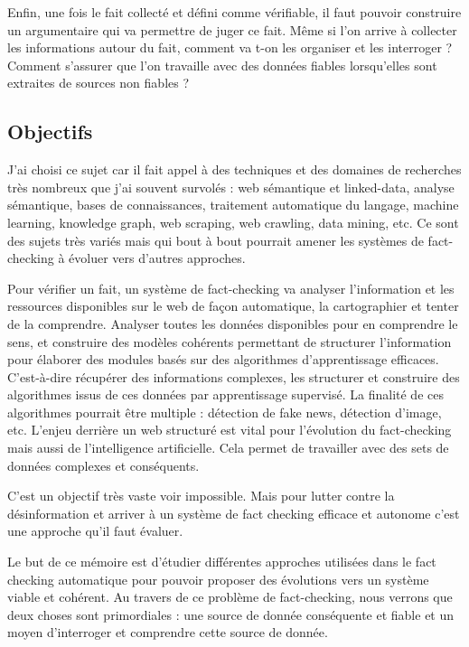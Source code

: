 Enfin, une fois le fait collecté et défini comme vérifiable, il faut pouvoir construire un argumentaire qui va permettre de juger ce fait. Même si l'on arrive à collecter les informations autour du fait, comment va t-on les organiser et les interroger ? Comment s'assurer que l'on travaille avec des données fiables lorsqu'elles sont extraites de sources non fiables ? 

\subsection{Objectifs}

J'ai choisi ce sujet car il fait appel à des techniques et des domaines de recherches très nombreux que j'ai souvent survolés : web sémantique et linked-data, analyse sémantique, bases de connaissances, traitement automatique du langage, machine learning, knowledge graph, web scraping, web crawling, data mining, etc. Ce sont des sujets très variés mais qui bout à bout pourrait amener les systèmes de fact-checking à évoluer vers d'autres approches. 

Pour vérifier un fait, un système de fact-checking va analyser l'information et les ressources disponibles sur le web de façon automatique, la cartographier et tenter de la comprendre. Analyser toutes les données disponibles pour en comprendre le sens, et construire des modèles cohérents permettant de structurer l'information pour élaborer des modules basés sur des algorithmes d'apprentissage efficaces. C'est-à-dire récupérer des informations complexes, les structurer et construire des algorithmes issus de ces données par apprentissage supervisé. La finalité de ces algorithmes pourrait être multiple : détection de fake news, détection d'image, etc. L'enjeu derrière un web structuré est vital pour l'évolution du fact-checking mais aussi de l'intelligence artificielle. Cela permet de travailler avec des sets de données complexes et conséquents.

C'est un objectif très vaste voir impossible. Mais pour lutter contre la désinformation et arriver à un système de fact checking efficace et autonome c'est une approche qu'il faut évaluer.

Le but de ce mémoire est d'étudier différentes approches utilisées dans le fact checking automatique pour pouvoir proposer des évolutions vers un système viable et cohérent. Au travers de ce problème de fact-checking, nous verrons que deux choses sont primordiales : une source de donnée conséquente et fiable et un moyen d'interroger et comprendre cette source de donnée.
